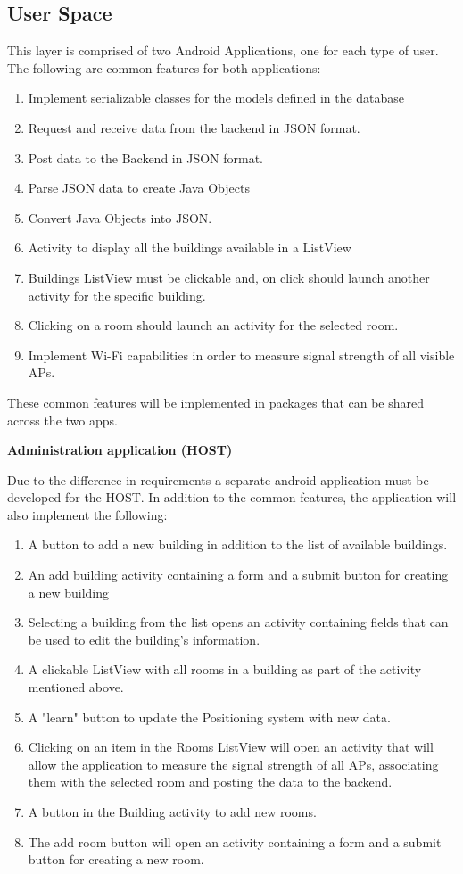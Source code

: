\subsection{User Space}
\noindent This layer is comprised of two Android Applications, one for each type of user. The following are common features for both applications:
\begin{enumerate}
\item Implement serializable classes for the models defined in the database
\item Request and receive data from the backend in JSON format.
\item Post data to the Backend in JSON format.
\item Parse JSON data to create Java Objects
\item Convert Java Objects into JSON.
\item Activity to display all the buildings available in a ListView
\item Buildings ListView must be clickable and, on click should launch another activity for the specific building.
\item Clicking on a room should launch an activity for the selected room.
\item Implement Wi-Fi capabilities in order to measure signal strength of all visible APs.
\end{enumerate}
These common features will be implemented in packages that can be shared across the two apps.

\noindent \textbf{Administration application (HOST)}

Due to the difference in requirements a separate android application must be developed for the HOST. In addition to the common features, the application will also implement the following:
\begin{enumerate}
\item A button to add a new building in addition to the list of available buildings.
\item An add building activity containing a form and a submit button for creating a new building
\item Selecting a building from the list opens an activity containing fields that can be used to edit the building’s information.
\item A clickable ListView with all rooms in a building as part of the activity mentioned above.
\item A "learn" button to update the Positioning system with new data.
\item Clicking on an item in the Rooms ListView will open an activity that will allow the application to measure the signal strength of all APs, associating them with the selected room and posting the data to the backend.
\item A button in the Building activity to add new rooms.
\item The add room button will open an activity containing a form and a submit button for creating a new room.
\end{enumerate}

